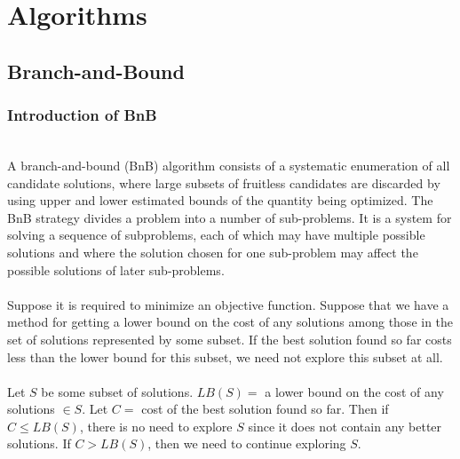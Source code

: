 \section{Algorithms}
\subsection{Branch-and-Bound}
\subsubsection{Introduction of BnB}
\hfill\\
A branch-and-bound (BnB) algorithm consists of a systematic enumeration of all candidate solutions, where large subsets of fruitless candidates are discarded by using upper and lower estimated bounds of the quantity being optimized. The BnB strategy divides a problem into a number of sub-problems. It is a system for solving a sequence of subproblems, each of which may have multiple possible solutions and where the solution chosen for one sub-problem may affect the possible solutions of later sub-problems.\\
\\
Suppose it is required to minimize an objective function. Suppose that we have a method for getting a lower bound on the cost of any solutions among those in the set of solutions represented by some subset. If the best solution found so far costs less than the lower bound for this subset, we need not explore this subset at all.\\
\\
Let $S$ be some subset of solutions. $LB(S) = $ a lower bound on the cost of any solutions $\in S$. Let $C = $ cost of the best solution found so far. Then if $C \leq LB(S)$, there is no need to explore $S$ since it does not contain any better solutions. If $C > LB(S)$, then we need to continue exploring $S$.

